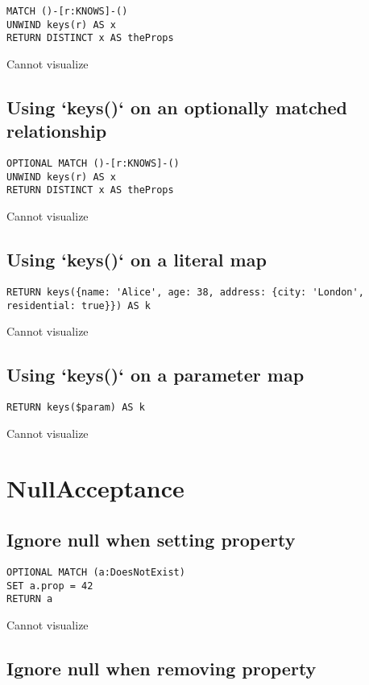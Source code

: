 \begin{lstlisting}
MATCH ()-[r:KNOWS]-()
UNWIND keys(r) AS x
RETURN DISTINCT x AS theProps
\end{lstlisting}

Cannot visualize
\subsection{Using `keys()` on an optionally matched relationship}

\begin{lstlisting}
OPTIONAL MATCH ()-[r:KNOWS]-()
UNWIND keys(r) AS x
RETURN DISTINCT x AS theProps
\end{lstlisting}

Cannot visualize
\subsection{Using `keys()` on a literal map}

\begin{lstlisting}
RETURN keys({name: 'Alice', age: 38, address: {city: 'London', residential: true}}) AS k
\end{lstlisting}

Cannot visualize
\subsection{Using `keys()` on a parameter map}

\begin{lstlisting}
RETURN keys($param) AS k
\end{lstlisting}

Cannot visualize
\section{NullAcceptance}

\subsection{Ignore null when setting property}

\begin{lstlisting}
OPTIONAL MATCH (a:DoesNotExist)
SET a.prop = 42
RETURN a
\end{lstlisting}

Cannot visualize
\subsection{Ignore null when removing property}


